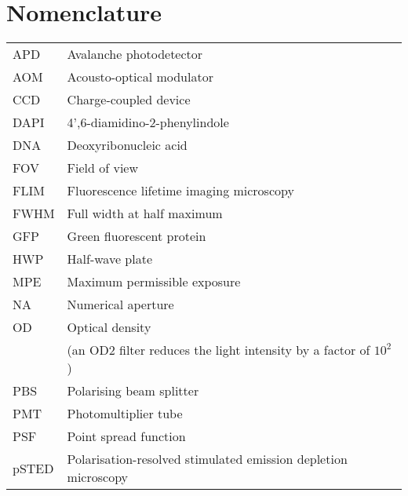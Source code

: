 \chapter{Nomenclature}

\begin{tabular}{ll}
	APD       & Avalanche photodetector                                             \\
	AOM       & Acousto-optical modulator                                           \\
	CCD       & Charge-coupled device                                               \\
	DAPI      & 4',6-diamidino-2-phenylindole                                       \\
	DNA       & Deoxyribonucleic acid                                               \\ %
	FOV       & Field of view                                                       \\
	FLIM      & Fluorescence lifetime imaging microscopy                            \\
	FWHM      & Full width at half maximum                                          \\
	GFP       & Green fluorescent protein                                           \\
	HWP       & Half-wave plate                                                     \\
	MPE       & Maximum permissible exposure                                        \\
	NA        & Numerical aperture                                                  \\
	OD        & Optical density                                                     \\
	          & (an OD2 filter reduces the light intensity by a factor of $ 10^2 $) \\
	PBS       & Polarising beam splitter                                            \\
	PMT       & Photomultiplier tube                                                \\
	PSF       & Point spread function                                               \\
	pSTED     & Polarisation-resolved stimulated emission depletion microscopy      \\

\end{tabular}
